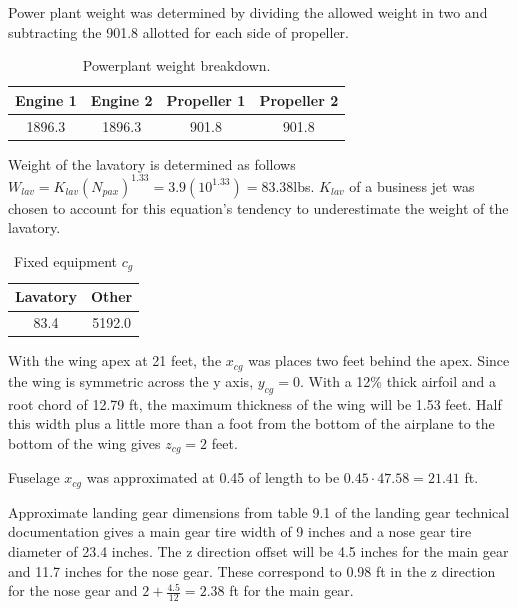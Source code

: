 \documentclass[conf]{new-aiaa}
\begin{document}
Power plant weight was determined by dividing the allowed weight in two and subtracting the 901.8 allotted for each side of propeller.

\begin{table}[H]
\centering
\label{tab:Powerplant Weight}
\caption{Powerplant weight breakdown.}
\begin{tabular}{|c|c|c|c|}\hline
Engine 1 & Engine 2 & Propeller 1 & Propeller 2 \\ \hline
1896.3 & 1896.3 & 901.8 & 901.8 \\ \hline
\end{tabular}
\end{table}

Weight of the lavatory is determined as follows $W_{lav} = K_{lav}(N_{pax})^1.33=3.9(10^{1.33})=83.38$lbs\cite{pres19}. $K_{lav}$ of a business jet was chosen to account for this equation's tendency to underestimate the weight of the lavatory.

\begin{table}[H]
\centering
\label{tab:Fixed Equipment Weight}
\caption{Fixed equipment $c_g$}
\begin{tabular}{|c|c|}\hline
Lavatory & Other \\ \hline
83.4 & 5192.0 \\ \hline
\end{tabular}
\end{table}

With the wing apex at 21 feet, the $x_{cg}$ was places two feet behind the apex. Since the wing is symmetric across the y axis, $y_{cg}=0$. With a 12\% thick airfoil and a root chord of 12.79 ft, the maximum thickness of the wing will be 1.53 feet. Half this width plus a little more than a foot from the bottom of the airplane to the bottom of the wing gives $z_{cg}=2$ feet.

Fuselage $x_{cg}$ was approximated at 0.45 of length\cite{pres19} to be $0.45\cdot47.58=21.41$ ft.

Approximate landing gear dimensions from table 9.1 of the landing gear technical documentation \cite{orange_book} gives a main gear tire width of 9 inches and a nose gear tire diameter of 23.4 inches. The z direction offset will be 4.5 inches for the main gear and 11.7 inches for the nose gear. These correspond to 0.98 ft in the z direction for the nose gear and $2+\frac{4.5}{12}=2.38$ ft for the main gear.
\end{document}
